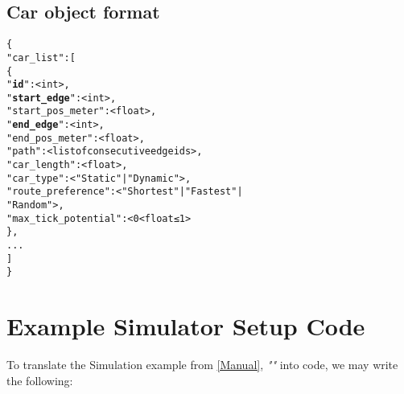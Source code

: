 \subsection{Car object format}

\begin{alltt}
\{
    "car_list": [
        \{
            "\textbf{id}": <int>,
            "\textbf{start_edge}": <int>, 
            "start_pos_meter": <float>, 
            "\textbf{end_edge}": <int>,
            "end_pos_meter": <float>,
            "path": <list of consecutive edge ids>,
            "car_length": <float>, 
            "car_type": <"Static" | "Dynamic">,
            "route_preference": <"Shortest" | "Fastest" | 
                                 "Random">,
            "max_tick_potential": <0 < float ≤ 1>
        \},
        ...
    ]
\}
\end{alltt}


\section{Example Simulator Setup Code}
\label{SampleCode}

\par To translate the Simulation example from \autoref{Manual}, \textit{""} into code, we may write the following:

